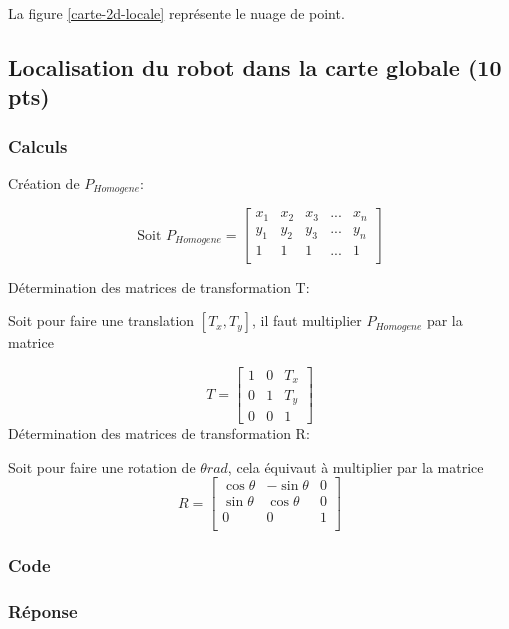 \documentclass[12pt]{article}
\begin{document}
La figure \ref{carte-2d-locale} représente le nuage de point.

\newpage
\subsection{Localisation du robot dans la carte globale (10 pts)}

\subsubsection{Calculs}
Création de $P_{Homogene}$:

\[ \text{Soit } P_{Homogene} = 
\begin{bmatrix} 
    x_1 & x_2 & x_3 & ... & x_n \\ 
    y_1 & y_2 & y_3 & ... & y_n \\ 
    1   & 1   & 1   & ... & 1   \\
\end{bmatrix} 
\]

D\'etermination des matrices de transformation T:

Soit pour faire une translation $[T_x, T_y]$, il faut multiplier $P_{Homogene}$ par la matrice

\[
    T = 
    \begin{bmatrix}
        1 & 0 & T_{x} \\ 
        0 & 1 & T_{y} \\
        0 & 0 & 1
    \end{bmatrix}
    \]
D\'etermination des matrices de transformation R:

Soit pour faire une rotation de $\theta rad$, cela \'equivaut \`a multiplier par la matrice
\[
    R =
    \begin{bmatrix}
        \cos{\theta} & -\sin{\theta} & 0 \\
        \sin{\theta} & \cos{\theta} & 0 \\
        0 & 0 & 1 \\
    \end{bmatrix}
    \]

\subsubsection{Code}
\subsubsection{Réponse}

\newpage
\end{document}
